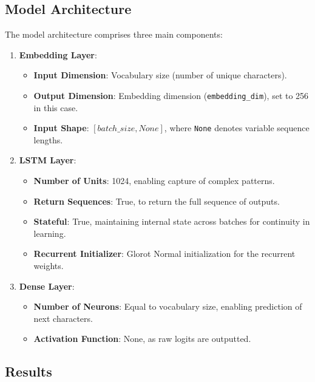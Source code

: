 \documentclass[conference]{IEEEtran}
\begin{document}
\subsection{Model Architecture}

The model architecture comprises three main components:

\begin{enumerate}
    \item \textbf{Embedding Layer}:
    \begin{itemize}
        \item \textbf{Input Dimension}: Vocabulary size (number of unique characters).
        \item \textbf{Output Dimension}: Embedding dimension (\texttt{embedding\_dim}), set to 256 in this case.
        \item \textbf{Input Shape}: \([batch\_size, None]\), where \texttt{None} denotes variable sequence lengths.
    \end{itemize}
    
    \item \textbf{LSTM Layer}:
    \begin{itemize}
        \item \textbf{Number of Units}: 1024, enabling capture of complex patterns.
        \item \textbf{Return Sequences}: True, to return the full sequence of outputs.
        \item \textbf{Stateful}: True, maintaining internal state across batches for continuity in learning.
        \item \textbf{Recurrent Initializer}: Glorot Normal initialization for the recurrent weights.
    \end{itemize}
    
    \item \textbf{Dense Layer}:
    \begin{itemize}
        \item \textbf{Number of Neurons}: Equal to vocabulary size, enabling prediction of next characters.
        \item \textbf{Activation Function}: None, as raw logits are outputted.
    \end{itemize}
\end{enumerate}

\subsection{Results}
\end{document}
